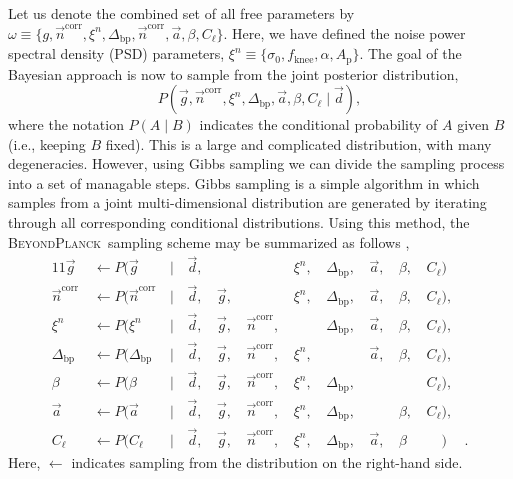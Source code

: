 \documentclass{aa}
\renewcommand{\d}[0]{\vec{d}}
\newcommand{\n}[0]{\vec{n}}
\renewcommand{\a}[0]{\vec{a}}
\newcommand{\g}[0]{\vec{g}}
\newcommand{\BP}{\textsc{BeyondPlanck}}
\begin{document}
Let us denote the combined set of all free parameters by
 $\omega\equiv\{g, \n^{\mathrm{corr}}, \xi^n,\Delta_\mathrm{bp},\n^{\mathrm{corr}}, \a,
\beta, C_{\ell}\}$. Here, we have defined the noise power spectral density (PSD) parameters, $\xi^n \equiv \{\sigma_0, f_\mathrm{knee},
\alpha, A_\mathrm{p}\}$. 
The goal of the Bayesian approach is now to sample from the joint posterior distribution,
\begin{equation}\label{eq:full_distribution}
        P(\g, \n^{\mathrm{corr}}, \xi^n,\Delta_\mathrm{bp}, \a, \beta, C_{\ell}\mid\d),
\end{equation}
where the notation $P(A\mid B)$ indicates the conditional probability of $A$ given $B$ (i.e., keeping
$B$ fixed). 
This is a large and complicated distribution, with many
degeneracies. However, using Gibbs sampling we can divide the sampling
process into a set of managable steps. Gibbs sampling is a simple
algorithm in which samples from a joint multi-dimensional
distribution are generated by iterating through all corresponding
conditional distributions. Using this method, the \BP\ sampling scheme may be summarized as follows \citep{bp01},
\begin{alignat}{11}
\label{eq:gain_samp_dist}\g &\,\leftarrow P(\g&\,|&\,\d,&\, & &\,\xi^n, 
&\,\Delta_\mathrm{bp}, &\,\a, &\,\beta, &\,C_{\ell})\\
\label{eq:ncorr_samp_dist} \n^{\mathrm{corr}} &\,\leftarrow P(\n^{\mathrm{corr}}&\,|&\,\d, &\,\g, &\,&\,\xi^n, 
&\,\Delta_\mathrm{bp}, &\,\a, &\,\beta, &\,C_{\ell}),\\ 
\label{eq:xi_samp_dist} \xi^n &\,\leftarrow P(\xi^n&\,|&\,\d, &\,\g, &\,\n^{\mathrm{corr}}, &\,
&\,\Delta_\mathrm{bp}, &\,\a, &\,\beta, &\,C_{\ell}),\\
\Delta_\mathrm{bp} &\,\leftarrow P(\Delta_\mathrm{bp}&\,|&\,\d, &\,\g, &\,\n^{\mathrm{corr}}, &\,\xi^n, 
&\,&\,\a, &\,\beta, &\,C_{\ell}),\\
\beta &\,\leftarrow P(\beta&\,|&\,\d, &\,\g, &\,\n^{\mathrm{corr}}, &\,\xi^n, 
&\,\Delta_\mathrm{bp}, & &\,&\,C_{\ell}),\\
\a &\,\leftarrow P(\a&\,|&\,\d, &\,\g, &\,\n^{\mathrm{corr}}, &\,\xi^n, 
&\,\Delta_\mathrm{bp}, &\,&\,\beta, &\,C_{\ell}),\\
C_{\ell} &\,\leftarrow P(C_{\ell}&\,\mid &\,\d, &\,\g, &\,\n^{\mathrm{corr}}, &\,\xi^n, &\,\Delta_\mathrm{bp}, &\,\a, &\,\beta&\,\phantom{C_{\ell}})&.
\end{alignat}
Here, $\leftarrow$ indicates sampling from the distribution on the
right-hand side. 
\end{document}

